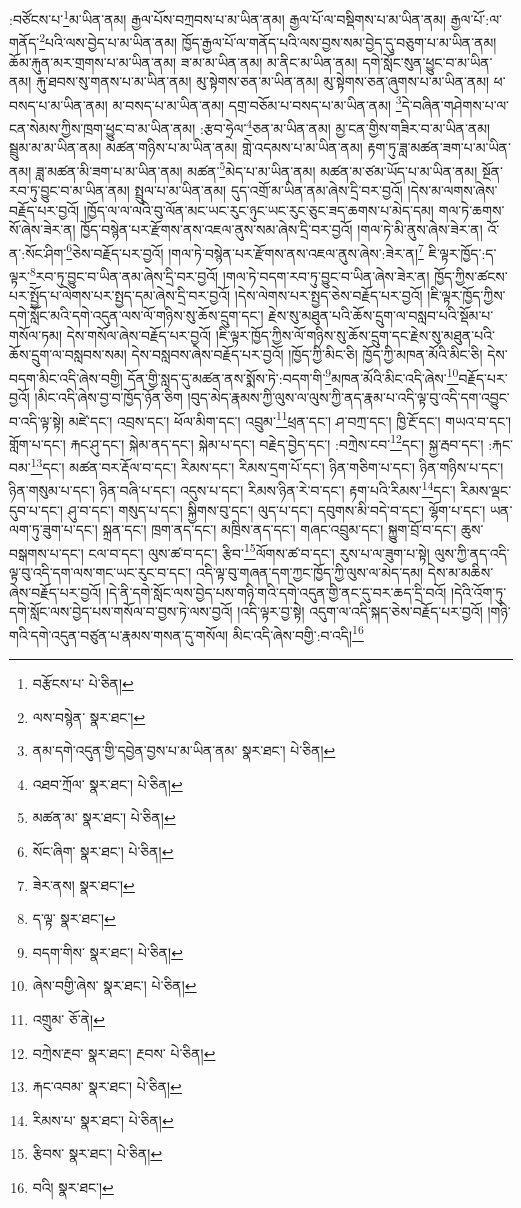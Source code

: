 :བཙོངས་པ་\footnote{བརྩོངས་པ་  པེ་ཅིན། }མ་ཡིན་ནམ། རྒྱལ་པོས་བཀྲབས་པ་མ་ཡིན་ནམ། རྒྱལ་པོ་ལ་བསྡིགས་པ་མ་ཡིན་ནམ། རྒྱལ་པོ་:ལ་གནོད་\footnote{ལས་བསྙེན་  སྣར་ཐང་། }པའི་ལས་བྱེད་པ་མ་ཡིན་ནམ། ཁྱོད་རྒྱལ་པོ་ལ་གནོད་པའི་ལས་བྱས་སམ་བྱེད་དུ་བཅུག་པ་མ་ཡིན་ནམ། ཆོམ་རྐུན་མར་གྲགས་པ་མ་ཡིན་ནམ། ཟ་མ་མ་ཡིན་ནམ། མ་ནིང་མ་ཡིན་ནམ། དགེ་སློང་སུན་ཕྱུང་བ་མ་ཡིན་ནམ། རྐུ་ཐབས་སུ་གནས་པ་མ་ཡིན་ནམ། མུ་སྟེགས་ཅན་མ་ཡིན་ནམ། མུ་སྟེགས་ཅན་ཞུགས་པ་མ་ཡིན་ནམ། ཕ་བསད་པ་མ་ཡིན་ནམ། མ་བསད་པ་མ་ཡིན་ནམ། དགྲ་བཅོམ་པ་བསད་པ་མ་ཡིན་ནམ། \footnote{ནམ་དགེ་འདུན་གྱི་དབྱེན་བྱས་པ་མ་ཡིན་ནམ་  སྣར་ཐང་།  པེ་ཅིན། }དེ་བཞིན་གཤེགས་པ་ལ་ངན་སེམས་ཀྱིས་ཁྲག་ཕྱུང་བ་མ་ཡིན་ནམ། :རྩབ་ཧྲེལ་\footnote{འཐབ་ཀྲོལ་  སྣར་ཐང་།  པེ་ཅིན། }ཅན་མ་ཡིན་ནམ། མྱ་ངན་གྱིས་གཟིར་བ་མ་ཡིན་ནམ། སྦྲུམ་མ་མ་ཡིན་ནམ། མཚན་གཉིས་པ་མ་ཡིན་ནམ། གླེ་འདམས་པ་མ་ཡིན་ནམ། རྟག་ཏུ་ཟླ་མཚན་ཟག་པ་མ་ཡིན་ནམ། ཟླ་མཚན་མི་ཟག་པ་མ་ཡིན་ནམ། མཚན་\footnote{མཚན་མ་  སྣར་ཐང་།  པེ་ཅིན། }མེད་པ་མ་ཡིན་ནམ། མཚན་མ་ཙམ་ཡོད་པ་མ་ཡིན་ནམ། སྔོན་རབ་ཏུ་བྱུང་བ་མ་ཡིན་ནམ། སྤྲུལ་པ་མ་ཡིན་ནམ། དུད་འགྲོ་མ་ཡིན་ནམ་ཞེས་དྲི་བར་བྱའོ། །དེས་མ་ལགས་ཞེས་བརྗོད་པར་བྱའོ། །ཁྱོད་ལ་ལ་ལའི་བུ་ལོན་མང་ཡང་རུང་ཉུང་ཡང་རུང་ཅུང་ཟད་ཆགས་པ་མེད་དམ། གལ་ཏེ་ཆགས་སོ་ཞེས་ཟེར་ན། ཁྱོད་བསྙེན་པར་རྫོགས་ནས་འཇལ་ནུས་སམ་ཞེས་དྲི་བར་བྱའོ། །གལ་ཏེ་མི་ནུས་ཞེས་ཟེར་ན། འོ་ན་:སོང་ཤིག་\footnote{སོང་ཞིག་  སྣར་ཐང་།  པེ་ཅིན། }ཅེས་བརྗོད་པར་བྱའོ། །གལ་ཏེ་བསྙེན་པར་རྫོགས་ནས་འཇལ་ནུས་ཞེས་:ཟེར་ན།\footnote{ཟེར་ནས།  སྣར་ཐང་། } ཇི་ལྟར་ཁྱོད་:ད་ལྟར་\footnote{ད་ལྟ་  སྣར་ཐང་། }རབ་ཏུ་བྱུང་བ་ཡིན་ནམ་ཞེས་དྲི་བར་བྱའོ། །གལ་ཏེ་བདག་རབ་ཏུ་བྱུང་བ་ཡིན་ཞེས་ཟེར་ན། ཁྱོད་ཀྱིས་ཚངས་པར་སྤྱོད་པ་ལེགས་པར་སྤྱད་དམ་ཞེས་དྲི་བར་བྱའོ། །དེས་ལེགས་པར་སྤྱད་ཅེས་བརྗོད་པར་བྱའོ། །ཇི་ལྟར་ཁྱོད་ཀྱིས་དགེ་སློང་མའི་དགེ་འདུན་ལས་ལོ་གཉིས་སུ་ཆོས་དྲུག་དང་། རྗེས་སུ་མཐུན་པའི་ཆོས་དྲུག་ལ་བསླབ་པའི་སྡོམ་པ་གསོལ་ཏམ། དེས་གསོལ་ཞེས་བརྗོད་པར་བྱའོ། །ཇི་ལྟར་ཁྱོད་ཀྱིས་ལོ་གཉིས་སུ་ཆོས་དྲུག་དང་རྗེས་སུ་མཐུན་པའི་ཆོས་དྲུག་ལ་བསླབས་སམ། དེས་བསླབས་ཞེས་བརྗོད་པར་བྱའོ། །ཁྱོད་ཀྱི་མིང་ཅི། ཁྱོད་ཀྱི་མཁན་མོའི་མིང་ཅི། དེས་བདག་མིང་འདི་ཞེས་བགྱི། དོན་གྱི་སླད་དུ་མཚན་ནས་སྨོས་ཏེ་:བདག་གི་\footnote{བདག་གིས་  སྣར་ཐང་།  པེ་ཅིན། }མཁན་མོའི་མིང་འདི་ཞེས་\footnote{ཞེས་བགྱི་ཞེས་  སྣར་ཐང་།  པེ་ཅིན། }བརྗོད་པར་བྱའོ། །མིང་འདི་ཞེས་བྱ་བ་ཁྱོད་ཉོན་ཅིག །བུད་མེད་རྣམས་ཀྱི་ལུས་ལ་ལུས་ཀྱི་ནད་རྣམ་པ་འདི་ལྟ་བུ་འདི་དག་འབྱུང་བ་འདི་ལྟ་སྟེ། མཛེ་དང་། འབྲས་དང་། ཕོལ་མིག་དང་། འབྲུམ་\footnote{འགྲུམ་  ཅོ་ནེ། }ཕྲན་དང་། ཤ་བཀྲ་དང་། ཁྱི་རྔོ་དང་། གཡའ་བ་དང་། གློག་པ་དང་། རྐང་ཤུ་དང་། སྐེམ་ནད་དང་། སྐེམ་པ་དང་། བརྗེད་བྱེད་དང་། :བཀྲེས་ངབ་\footnote{བཀྲེས་རྔབ་  སྣར་ཐང་། རྔབས་  པེ་ཅིན། }དང་། སྐྱ་རྦབ་དང་། :རྐང་བམ་\footnote{རྐང་འབམ་  སྣར་ཐང་།  པེ་ཅིན། }དང་། མཚན་བར་རྡོལ་བ་དང་། རིམས་དང་། རིམས་དྲག་པོ་དང་། ཉིན་གཅིག་པ་དང་། ཉིན་གཉིས་པ་དང་། ཉིན་གསུམ་པ་དང་། ཉིན་བཞི་པ་དང་། འདུས་པ་དང་། རིམས་ཉིན་རེ་བ་དང་། རྟག་པའི་རིམས་\footnote{རིམས་པ་  སྣར་ཐང་།  པེ་ཅིན། }དང་། རིམས་ལྡང་དུབ་པ་དང་། ཤུ་བ་དང་། གསུད་པ་དང་། སྐྱིགས་བུ་དང་། ལུད་པ་དང་། དབུགས་མི་བདེ་བ་དང་། ལྷོག་པ་དང་། ཡན་ལག་ཏུ་ཟུག་པ་དང་། སྐྲན་དང་། ཁྲག་ནད་དང་། མཁྲིས་ནད་དང་། གཞང་འབྲུམ་དང་། སྐྱུག་བྲོ་བ་དང་། ཆུས་བསྒགས་པ་དང་། ངལ་བ་དང་། ལུས་ཚ་བ་དང་། རྩིབ་\footnote{རྩིབས་  སྣར་ཐང་།  པེ་ཅིན། }ལོགས་ཚ་བ་དང་། རུས་པ་ལ་ཟུག་པ་སྟེ། ལུས་ཀྱི་ནད་འདི་ལྟ་བུ་འདི་དག་ལས་གང་ཡང་རུང་བ་དང་། འདི་ལྟ་བུ་གཞན་དག་ཀྱང་ཁྱོད་ཀྱི་ལུས་ལ་མེད་དམ། དེས་མ་མཆིས་ཞེས་བརྗོད་པར་བྱའོ། །དེ་ནི་དགེ་སློང་ལས་བྱེད་པས་གཉི་གའི་དགེ་འདུན་གྱི་ནང་དུ་བར་ཆད་དྲི་བའོ། །དེའི་འོག་ཏུ་དགེ་སློང་ལས་བྱེད་པས་གསོལ་བ་བྱས་ཏེ་ལས་བྱའོ། །འདི་ལྟར་བྱ་སྟེ། འདུག་ལ་འདི་སྐད་ཅེས་བརྗོད་པར་བྱའོ། །གཉི་གའི་དགེ་འདུན་བཙུན་པ་རྣམས་གསན་དུ་གསོལ། མིང་འདི་ཞེས་བགྱི་:བ་འདི།\footnote{བའི།  སྣར་ཐང་། } 